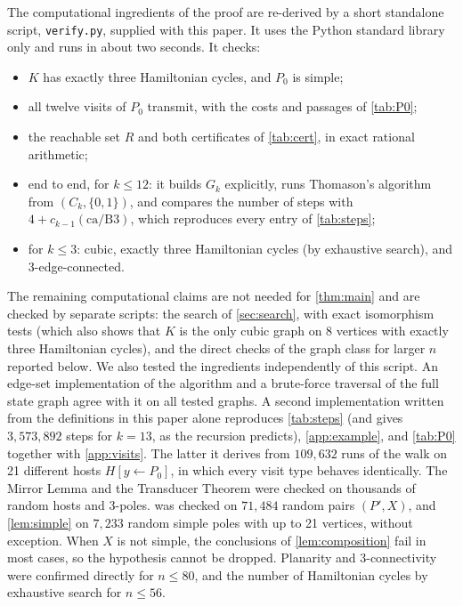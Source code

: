 \documentclass[11pt]{article}
\theoremstyle{definition}
\begin{document}
The computational ingredients of the proof are re-derived by a short standalone script,
\texttt{verify.py}, supplied with this paper. It uses the Python standard library only and runs in
about two seconds. It checks:
\begin{itemize}
\item $K$ has exactly three Hamiltonian cycles, and $P_0$ is simple;
\item all twelve visits of $P_0$ transmit, with the costs and passages of \cref{tab:P0};
\item the reachable set $R$ and both certificates of \cref{tab:cert}, in exact rational
arithmetic;
\item end to end, for $k \le 12$: it builds $G_k$ explicitly, runs Thomason's algorithm from
$(C_k, \{0,1\})$, and compares the number of steps with $4 + c_{k-1}(\mathrm{ca/B3})$, which
reproduces every entry of \cref{tab:steps};
\item for $k \le 3$: cubic, exactly three Hamiltonian cycles (by exhaustive search), and
3-edge-connected.
\end{itemize}
The remaining computational claims are not needed for \cref{thm:main} and are checked by separate
scripts: the search of \cref{sec:search}, with exact isomorphism tests (which also shows that $K$
is the only cubic graph on 8 vertices with exactly three Hamiltonian cycles), and the direct checks
of the graph class for larger $n$ reported below.
We also tested the ingredients independently of this script. An edge-set implementation of the
algorithm and a brute-force traversal of the full state graph agree with it on all tested graphs.
A second implementation written from the definitions in this paper alone reproduces
\cref{tab:steps} (and gives $3{,}573{,}892$ steps for $k = 13$, as the recursion predicts),
\cref{app:example}, and \cref{tab:P0} together with \cref{app:visits}. The latter it derives from
$109{,}632$ runs of the walk on 21 different hosts $H[y \leftarrow P_0]$, in which every visit type
behaves identically.
The Mirror Lemma and the Transducer Theorem were checked on thousands of random hosts and 3-poles.
 was checked on $71{,}484$ random pairs $(P', X)$, and \cref{lem:simple} on
$7{,}233$ random simple poles with up to 21 vertices, without exception. When $X$ is not simple, the
conclusions of \cref{lem:composition} fail in most cases, so the hypothesis cannot be dropped.
Planarity and 3-connectivity were confirmed directly for $n \le 80$, and the number of Hamiltonian
cycles by exhaustive search for $n \le 56$.
\end{document}

